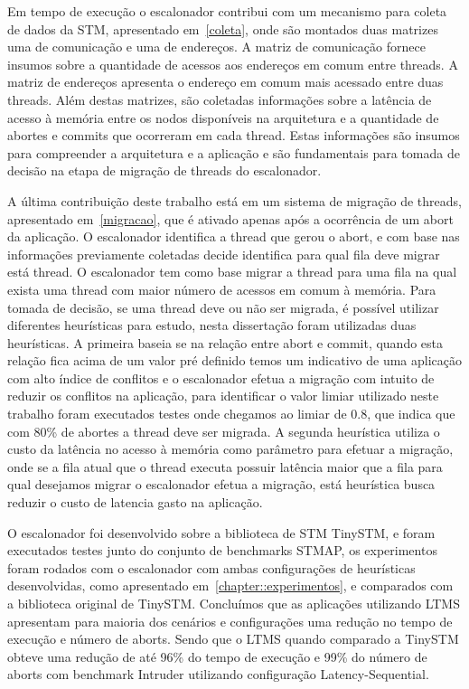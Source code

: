 \documentclass[diss,capa]{texufpel}
\begin{document}
Em tempo de execução o escalonador contribui com um mecanismo para coleta de dados da STM, apresentado em~\ref{coleta}, onde são montados duas matrizes uma de comunicação e uma de endereços. A matriz de comunicação fornece insumos sobre a quantidade de acessos aos endereços em comum entre threads. A matriz de endereços apresenta o endereço em comum mais acessado entre duas threads. Além destas matrizes, são coletadas informações sobre a latência de acesso à memória entre os nodos disponíveis na arquitetura e a quantidade de abortes e commits que ocorreram em cada thread. Estas informações são insumos para compreender a arquitetura e a aplicação e são fundamentais para tomada de decisão na etapa de migração de threads do escalonador.

A última contribuição deste trabalho está em um sistema de migração de threads, apresentado em~\ref{migracao}, que é ativado apenas após a ocorrência de um abort da aplicação. O escalonador identifica a thread que gerou o abort, e com base nas informações previamente coletadas decide identifica para qual fila deve migrar está thread. O escalonador tem como base migrar a thread para uma fila na qual exista uma thread com maior número de acessos em comum à memória. Para tomada de decisão, se uma thread deve ou não ser migrada, é possível utilizar diferentes heurísticas para estudo, nesta dissertação foram utilizadas duas heurísticas. A primeira baseia se na relação entre abort e commit, quando esta relação fica acima de um valor pré definido temos um indicativo de uma aplicação com alto índice de conflitos e o escalonador efetua a migração com intuito de reduzir os conflitos na aplicação, para identificar o valor limiar utilizado neste trabalho foram executados testes onde chegamos ao limiar de 0.8, que indica que com 80\% de abortes a thread deve ser migrada. A segunda heurística utiliza o custo da latência no acesso à memória como parâmetro para efetuar a migração, onde se a fila atual que o thread executa possuir latência maior que a fila para qual desejamos migrar o escalonador efetua a migração, está heurística busca reduzir o custo de latencia gasto na aplicação.

O escalonador foi desenvolvido sobre a biblioteca de STM TinySTM, e foram executados testes junto do conjunto de benchmarks STMAP, os experimentos foram rodados com o escalonador com ambas configurações de heurísticas desenvolvidas, como apresentado em~\ref{chapter::experimentos}, e comparados com a biblioteca original de TinySTM. Concluímos que as aplicações utilizando LTMS apresentam para maioria dos cenários e configurações uma redução no tempo de execução e número de aborts. Sendo que o LTMS quando comparado a TinySTM obteve uma redução de até 96\% do tempo de execução e 99\% do número de aborts com benchmark Intruder utilizando configuração Latency-Sequential.
\end{document}
